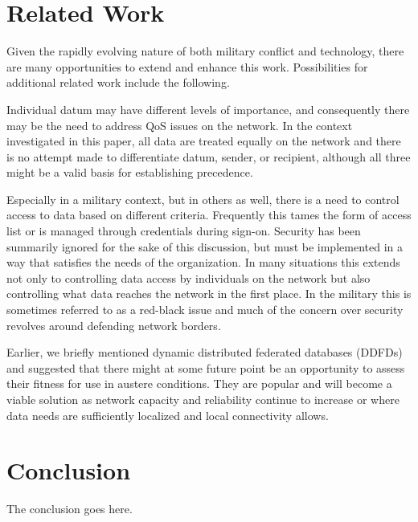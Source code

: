 \documentclass[10pt]{./IEEEtran}
\begin{document}
\section{Related Work}
\label{sec:related}
Given the rapidly evolving nature of both military conflict and technology, there are many opportunities to extend and enhance this work.  Possibilities for additional related work include the following.

Individual datum may have different levels of importance, and consequently there may be the need to address QoS issues on the network.  In the context investigated in this paper, all data are treated equally on the network and there is no attempt made to differentiate datum, sender, or recipient, although all three might be a valid basis for establishing precedence.

Especially in a military context, but in others as well, there is a need to control access to data based on different criteria.  Frequently this tames the form of access list or is managed through credentials during sign-on.  Security has been summarily ignored for the sake of this discussion, but must be implemented in a way that satisfies the needs of the organization.  In many situations this extends not only to controlling data access by individuals on the network but also controlling what data reaches the network in the first place.  In the military this is sometimes referred to as a red-black issue and much of the concern over security revolves around defending network borders.
	
Earlier, we briefly mentioned dynamic distributed federated databases (DDFDs) and suggested that there might at some future point be an opportunity to assess their fitness for use in austere conditions.  They are popular and will become a viable solution as network capacity and reliability continue to increase or where data needs are sufficiently localized and local connectivity allows.

\section{Conclusion}
\label{sec:conclusion}
The conclusion goes here.


%
%
\end{document}
